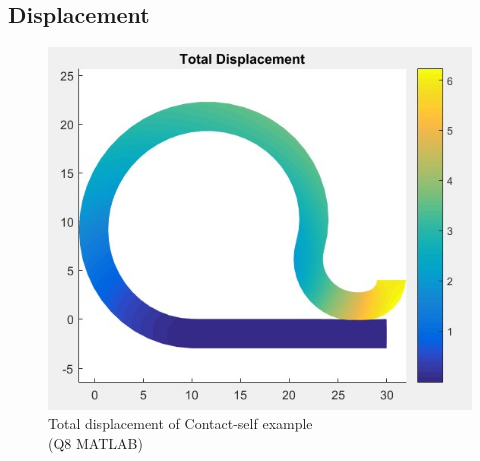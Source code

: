\subsection{Displacement}
\begin{figure}[H]
    \centering
    \includegraphics[scale=0.6]{Figures/t_displace_self_q8_matlab.jpg}
    \decoRule
    \caption{Total displacement of Contact-self example \\ (Q8 MATLAB)}
    \label{fig:t_displace_self_q8_matlab}
\end{figure} \noindent

